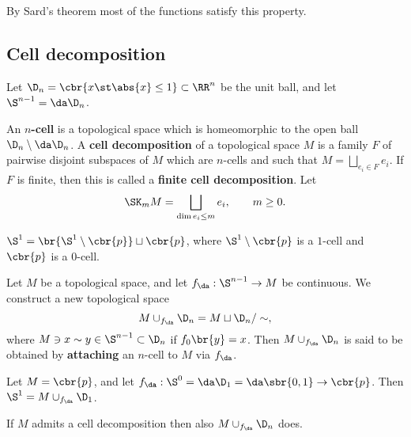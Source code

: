 \begin{fact*}
By Sard's theorem most of the functions satisfy this property.
\end{fact*}

\subsection{Cell decomposition}


\begin{notation*}
Let $ \D_n = \cbr{x \st \abs{x} \le 1} \subset \RR^n $ be the unit ball, and let $ \S^{n - 1} = \da\D_n $.
\end{notation*}

\begin{definition}
An \textbf{$ n $-cell} is a topological space which is homeomorphic to the open ball $ \D_n \setminus \da\D_n $. A \textbf{cell decomposition} of a topological space $ M $ is a family $ F $ of pairwise disjoint subspaces of $ M $ which are $ n $-cells and such that $ M = \bigsqcup_{e_i \in F} e_i $. If $ F $ is finite, then this is called a \textbf{finite cell decomposition}. Let
$$ \SK_m M = \bigsqcup_{\dim e_i \le m} e_i, \qquad m \ge 0. $$
\end{definition}

\begin{example}
$ \S^1 = \br{\S^1 \setminus \cbr{p}} \sqcup \cbr{p} $, where $ \S^1 \setminus \cbr{p} $ is a $ 1 $-cell and $ \cbr{p} $ is a $ 0 $-cell.
\end{example}

\begin{notation}
Let $ M $ be a topological space, and let $ f_\da : \S^{n - 1} \to M $ be continuous. We construct a new topological space
$$ M \cup_{f_\da} \D_n = M \sqcup \D_n / \sim, $$
where $ M \ni x \sim y \in \S^{n - 1} \subset \D_n $ if $ f_0\br{y} = x $. Then $ M \cup_{f_\da} \D_n $ is said to be obtained by \textbf{attaching} an $ n $-cell to $ M $ via $ f_\da $.
\end{notation}

\begin{example*}
Let $ M = \cbr{p} $, and let $ f_\da : \S^0 = \da\D_1 = \da\sbr{0, 1} \to \cbr{p} $. Then $ \S^1 = M \cup_{f_\da} \D_1 $.
\end{example*}

\begin{exercise*}
If $ M $ admits a cell decomposition then also $ M \cup_{f_\da} \D_n $ does.
\end{exercise*}

